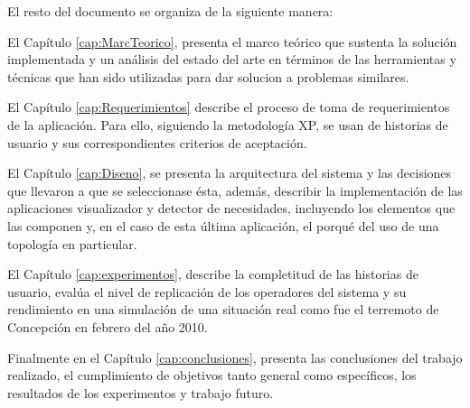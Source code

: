 El resto del documento se organiza de la siguiente manera:

El Capítulo \ref{cap:MarcTeorico}, presenta el marco teórico que sustenta la solución implementada y un análisis del estado del arte en términos de las herramientas y técnicas que han sido utilizadas para dar solucion a problemas similares.

El Capítulo \ref{cap:Requerimientos} describe el proceso de toma de requerimientos de la aplicación. Para ello, siguiendo la metodología XP, se usan de historias de usuario y sus correspondientes criterios de aceptación.

El Capítulo \ref{cap:Diseno}, se presenta la arquitectura del sistema y las decisiones que llevaron a que se seleccionase ésta, además, describir la implementación de las aplicaciones visualizador y detector de necesidades, incluyendo los elementos que las componen y, en el caso de esta última aplicación, el porqué del uso de una topología en particular.

El Capítulo \ref{cap:experimentos}, describe la completitud de las historias de usuario, evalúa el nivel de replicación de los operadores del sistema y su rendimiento en una simulación de una situación real como fue el terremoto de Concepción en febrero del año 2010.

Finalmente en el Capítulo \ref{cap:conclusiones}, presenta las conclusiones del trabajo realizado, el cumplimiento de objetivos tanto general como específicos, los resultados de los experimentos y trabajo futuro.
